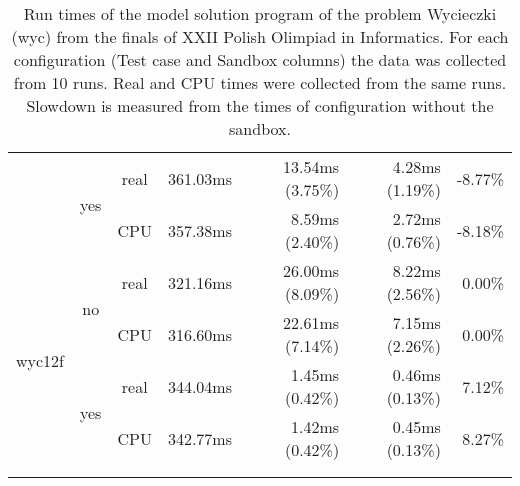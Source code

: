 \documentclass[en]{pracamgr}
\begin{document}
\begin{appendices}
\begin{small}
\begin{longtable}{|l|c|c|r|r|r|r|}
                          \cline{2-7}
                          & \multirow{2}{*}{yes} & real & 361.03ms & 13.54ms (3.75\%) & 4.28ms (1.19\%) & -8.77\% \\*
                          &                      & CPU  & 357.38ms & 8.59ms (2.40\%) & 2.72ms (0.76\%) & -8.18\% \\
\hline
\multirow{4}{*}{wyc12f}   & \multirow{2}{*}{no}  & real & 321.16ms & 26.00ms (8.09\%) & 8.22ms (2.56\%) & 0.00\% \\*
                          &                      & CPU  & 316.60ms & 22.61ms (7.14\%) & 7.15ms (2.26\%) & 0.00\% \\*
                          \cline{2-7}
                          & \multirow{2}{*}{yes} & real & 344.04ms & 1.45ms (0.42\%) & 0.46ms (0.13\%) & 7.12\% \\*
                          &                      & CPU  & 342.77ms & 1.42ms (0.42\%) & 0.45ms (0.13\%) & 8.27\% \\
\hline
\multicolumn{1}{c}{}\\ %
\caption{Run times of the model solution program of the problem Wycieczki (wyc) from the finals of XXII Polish Olimpiad in Informatics. For each configuration (Test case and Sandbox columns) the data was collected from 10 runs. Real and CPU times were collected from the same runs. Slowdown is measured from the times of configuration without the sandbox.}
\label{table:wyc_model_solution_runtimes}
\end{longtable}
\end{small}


\end{appendices}
\end{document}
